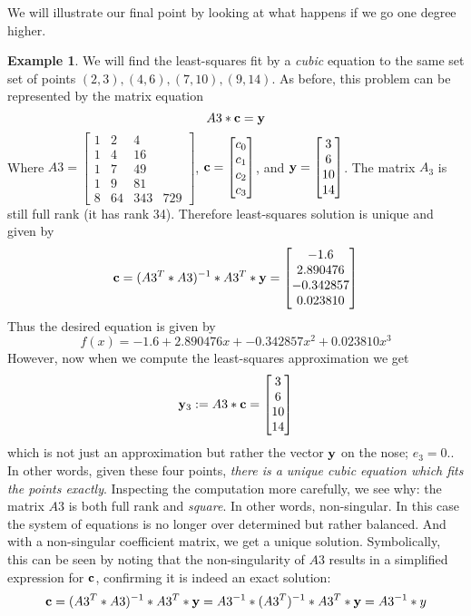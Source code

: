 \documentclass[11pt,notitlepage]{article}
\numberwithin{equation}{section}
\theoremstyle{plain}
\theoremstyle{definition}
\newtheorem{example}[equation]{Example}
\begin{document}
We will illustrate our final point by looking at what happens if we go one degree higher.

\begin{example} We will find the least-squares fit by a {\it cubic} equation to the same set set of points $(2,3), (4,6), (7,10), (9,14)$. As before, this problem can be represented by the matrix equation
\[
A3*{\bf c} = {\bf y}
\]
Where $A3 = \begin{bmatrix} 1 & 2 & 4\\1 & 4 & 16\\1 & 7 & 49\\1 & 9 & 81\\8 & 64 & 343 & 729\end{bmatrix}$, ${\bf c} = \begin{bmatrix}c_0\\c_1\\c_2\\c_3\end{bmatrix}$, and ${\bf y} = \begin{bmatrix} 3\\6\\10\\14\end{bmatrix}$. The matrix $A_3$ is still full rank (it has rank 34). Therefore least-squares solution is unique and given by
\[
{\bf c} = (A3^T*A3)^{-1}*A3^T*{\bf y} = \begin{bmatrix} -1.6\\ 2.890476\\-0.342857\\0.023810\end{bmatrix}
\]
Thus the desired equation is given by
\[
f(x) = -1.6 + 2.890476 x + -0.342857 x^2 + 0.023810 x^3
\]
However, now when we compute the least-squares approximation we get
\[
{\bf y}_3 := A3*{\bf c} = \begin{bmatrix} 3\\ 6\\ 10\\ 14\end{bmatrix}
\]
which is not just an approximation but rather the vector $\bf y$ on the nose; $e_3 = 0$.. In other words, given these four points, {\it there is a unique cubic equation which fits the points exactly}. Inspecting the computation more carefully, we see why: the matrix $A3$ is both full rank and {\it square}. In other words, non-singular. In this case the system of equations is no longer over determined but rather balanced. And with a non-singular coefficient matrix, we get a unique solution. Symbolically, this can be seen by noting that the non-singularity of $A3$ results in a simplified expression for $\bf c$, confirming it is indeed an exact solution:
\[
{\bf c} = (A3^T*A3)^{-1}*A3^T*{\bf y} = A3^{-1}*(A3^T)^{-1}*A3^T*{\bf y} = A3^{-1}*y
\]
\end{example}
\end{document}
